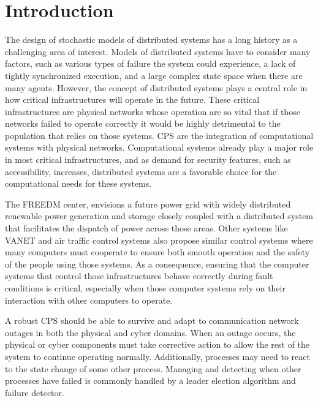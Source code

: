\chapter{Introduction}

The design of stochastic models of distributed systems has a long history as a challenging area of interest.
Models of distributed systems have to consider many factors, such as various types of failure the system could experience, a lack of tightly synchronized execution, and a large complex state space when there are many agents\cite{DISTRIBUTED}\cite{distributed-challenges}. 
However, the concept of distributed systems plays a central role in how critical infrastructures will operate in the future.
These critical infrastructures are physical networks whose operation are so vital that if those networks failed to operate correctly it would be highly detrimental to the population that relies on those systems.
\ac{CPS} are the integration of computational systems with physical networks.
Computational systems already play a major role in most critical infrastructures, and as demand for security features, such as accessibility, increases, distributed systems are a favorable choice for the computational needs for these systems\cite{SMARTGRIDBENEFITS}.

The \ac{FREEDM} center\cite{FREEDM}, envisions a future power grid with widely distributed renewable power generation and storage closely coupled with a distributed system that facilitates the dispatch of power across those areas.
Other systems like \ac{VANET}\cite{CARS1}\cite{CARS2}\cite{vanet-congestion} and air traffic control systems\cite{AIRTRAFFIC1}\cite{AIRTRAFFIC2} also propose similar control systems where many computers must cooperate to ensure both smooth operation and the safety of the people using those systems.
As a consequence, ensuring that the computer systems that control those infrastructures behave correctly during fault conditions is critical, especially when those computer systems rely on their interaction with other computers to operate.

A robust \ac{CPS} should be able to survive and adapt to communication network outages in both the physical and cyber domains.
When an outage occurs, the physical or cyber components must take corrective action to allow the rest of the system to continue operating normally.
Additionally, processes may need to react to the state change of some other process.
Managing and detecting when other processes have failed is commonly handled by a leader election algorithm and failure detector.

